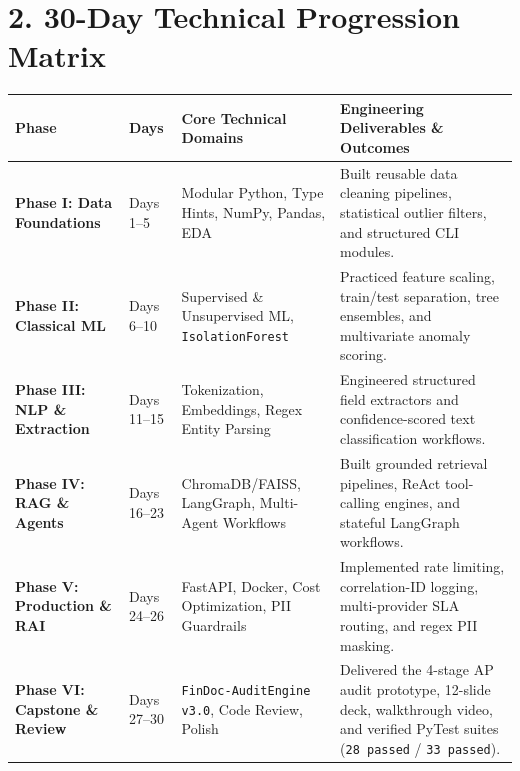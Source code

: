 \documentclass[a4paper,10pt]{article}
\begin{document}
\section{2. 30-Day Technical Progression Matrix}
\begin{tabularx}{\textwidth}{@{}p{1.35in}p{0.65in}p{1.75in}X@{}}
\toprule
\textbf{Phase} & \textbf{Days} & \textbf{Core Technical Domains} & \textbf{Engineering Deliverables \& Outcomes} \\
\midrule
\textbf{Phase I: Data Foundations} & Days 1--5 & Modular Python, Type Hints, NumPy, Pandas, EDA & Built reusable data cleaning pipelines, statistical outlier filters, and structured CLI modules. \\
\addlinespace[3pt]
\textbf{Phase II: Classical ML} & Days 6--10 & Supervised \& Unsupervised ML, \texttt{IsolationForest} & Practiced feature scaling, train/test separation, tree ensembles, and multivariate anomaly scoring. \\
\addlinespace[3pt]
\textbf{Phase III: NLP \& Extraction} & Days 11--15 & Tokenization, Embeddings, Regex Entity Parsing & Engineered structured field extractors and confidence-scored text classification workflows. \\
\addlinespace[3pt]
\textbf{Phase IV: RAG \& Agents} & Days 16--23 & ChromaDB/FAISS, LangGraph, Multi-Agent Workflows & Built grounded retrieval pipelines, ReAct tool-calling engines, and stateful LangGraph workflows. \\
\addlinespace[3pt]
\textbf{Phase V: Production \& RAI} & Days 24--26 & FastAPI, Docker, Cost Optimization, PII Guardrails & Implemented rate limiting, correlation-ID logging, multi-provider SLA routing, and regex PII masking. \\
\addlinespace[3pt]
\textbf{Phase VI: Capstone \& Review} & Days 27--30 & \texttt{FinDoc-AuditEngine v3.0}, Code Review, Polish & Delivered the 4-stage AP audit prototype, 12-slide deck, walkthrough video, and verified PyTest suites (\texttt{28 passed} / \texttt{33 passed}). \\
\bottomrule
\end{tabularx}
\end{document}
